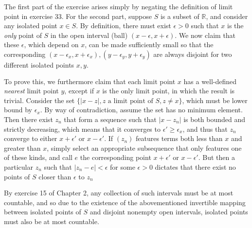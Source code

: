 \begin{solution}

    The first part of the exercise arises simply by negating the definition of limit point in exercise 33.
    For the second part, suppose $S$ is a subset of $\mathbb{R}$, and consider any isolated point $x \in S$.
    By definition, there must exist $\epsilon > 0$ such that $x$ is the \textit{only} point of $S$ in the open interval (ball) $(x - \epsilon, x + \epsilon)$.
    We now claim that these $\epsilon$, which depend on $x$, can be made sufficiently small so that the corresponding $(x - \epsilon_x, x + \epsilon_x), (y - \epsilon_y, y + \epsilon_y)$ are always disjoint for two different isolated points $x, y$.

    To prove this, we furthermore claim that each limit point $x$ has a well-defined \textit{nearest} limit point $y$, except if $x$ is the only limit point, in which the result is trivial.
    Consider the set $\{ \lvert x - z \rvert, z \text{ a limit point of } S, z \neq x\}$, which must be lower bound by $\epsilon_x$.
    By way of contradiction, assume the set has no minimum element.
    Then there exist $z_n$ that form a sequence such that $\lvert x - z_n \rvert$ is both bounded and strictly decreasing, which means that it converges to $\epsilon' \geq \epsilon_x$, and thus that $z_n$ converge to either $x + \epsilon'$ or $x - \epsilon'$.
    If $(z_n)$ features terms both less than $x$ and greater than $x$, simply select an appropriate subsequence that only features one of these kinds, and call $e$ the corresponding point $x + \epsilon'$ or $x - \epsilon'$.
    But then a particular $z_n$ such that $\lvert z_n - e \rvert < \epsilon$ for some $\epsilon > 0$ dictates that there exist no points of $S$ closer than $\epsilon$ to $z_n$

    By exercise 15 of Chapter 2, any collection of such intervals must be at most countable, and so due to the existence of the abovementioned invertible mapping between isolated points of $S$ and disjoint nonempty open intervals, isolated points must also be at most countable.
\end{solution}

